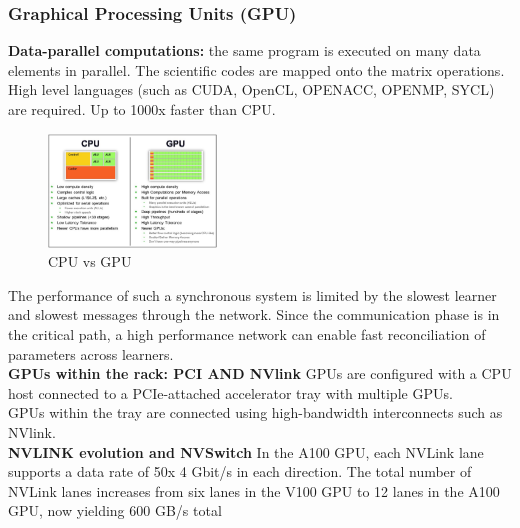 \documentclass[10pt, oneside]{article}
\begin{document}
\subsubsection{Graphical Processing Units (GPU)}
\textbf{Data-parallel computations:}
the same program is executed on many data elements in parallel. The scientific codes are mapped onto the matrix operations. High level languages (such as CUDA, OpenCL, OPENACC, OPENMP, SYCL) are required. Up to 1000x faster than CPU.
\begin{figure}[H]
    \begin{center}
    \includegraphics[width=0.4\textwidth]{img/img9.png}
    \caption{CPU vs GPU}
    \label{fig:CPU vs GPU}
    \end{center}
\end{figure}
The performance of such a synchronous system is limited by the slowest learner and slowest messages through the network. Since the communication phase is in the critical path, a high performance network can enable fast reconciliation of parameters across learners.\\
\textbf{GPUs within the rack: PCI AND NVlink}
GPUs are configured with a CPU host connected to a PCIe-attached accelerator tray with multiple GPUs.\\GPUs within the tray are connected using high-bandwidth interconnects such as NVlink.\\
\textbf{NVLINK evolution and NVSwitch}
In the A100 GPU, each NVLink lane supports a data rate of 50x 4 Gbit/s in each direction. The total number of NVLink lanes increases from six lanes in the V100 GPU to 12 lanes in the A100 GPU, now yielding 600 GB/s total
\end{document}
